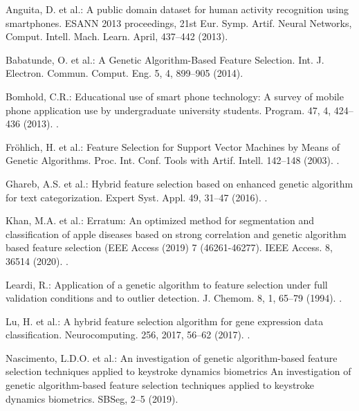 \documentclass[runningheads]{llncs}
\begin{document}
\begin{thebibliography}{8}

Anguita, D. et al.: A public domain dataset for human activity recognition using smartphones. ESANN 2013 proceedings, 21st Eur. Symp. Artif. Neural Networks, Comput. Intell. Mach. Learn. April, 437–442 (2013).

Babatunde, O. et al.: A Genetic Algorithm-Based Feature Selection. Int. J. Electron. Commun. Comput. Eng. 5, 4, 899–905 (2014).

Bomhold, C.R.: Educational use of smart phone technology: A survey of mobile phone application use by undergraduate university students. Program. 47, 4, 424–436 (2013). .

Fröhlich, H. et al.: Feature Selection for Support Vector Machines by Means of Genetic Algorithms. Proc. Int. Conf. Tools with Artif. Intell. 142–148 (2003). .

Ghareb, A.S. et al.: Hybrid feature selection based on enhanced genetic algorithm for text categorization. Expert Syst. Appl. 49, 31–47 (2016). .

Khan, M.A. et al.: Erratum: An optimized method for segmentation and classification of apple diseases based on strong correlation and genetic algorithm based feature selection (EEE Access (2019) 7 (46261-46277). IEEE Access. 8, 36514 (2020). .

Leardi, R.: Application of a genetic algorithm to feature selection under full validation conditions and to outlier detection. J. Chemom. 8, 1, 65–79 (1994). .

Lu, H. et al.: A hybrid feature selection algorithm for gene expression data classification. Neurocomputing. 256, 2017, 56–62 (2017). .

Nascimento, L.D.O. et al.: An investigation of genetic algorithm-based feature selection techniques applied to keystroke dynamics biometrics An investigation of genetic algorithm-based feature selection techniques applied to keystroke dynamics biometrics. SBSeg, 2–5 (2019).


\end{thebibliography}
\end{document}
